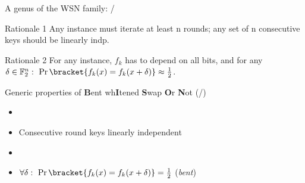 \begin{frame}{A genus of the WSN family: \bison/}
    \centering
    \begin{exampleblock}{Rationale 1}
        Any instance must iterate at least n rounds; any set of n consecutive keys should be linearly indp.
    \end{exampleblock}
    \begin{exampleblock}{Rationale 2}
        For any instance, $f_{k}$ has to depend on all bits, and for any $\delta \in \F_2^n:\ \Pr\bracket{f_k(x) = f_k(x + \delta)} \approx \frac{1}{2}$.
    \end{exampleblock}
    \begin{block}{Generic properties of {\textbf{B}ent wh\textbf{I}tened \textbf{S}wap \textbf{O}r \textbf{N}ot} (\bison/)}
        \vspace{5pt}
        \begin{minipage}{0.51\textwidth}
        \begin{itemize}
            \item {}
            \item Consecutive round keys linearly independent
        \end{itemize}
        \end{minipage}
        \begin{minipage}{0.44\textwidth}
        \begin{itemize}
            \item {}
            \item $\forall \delta :\ \Pr\bracket{f_k(x) = f_k(x + \delta)} = \frac{1}{2}$ (\emph{bent})
        \end{itemize}
        \end{minipage}
        \vspace{5pt}
    \end{block}
\end{frame}
